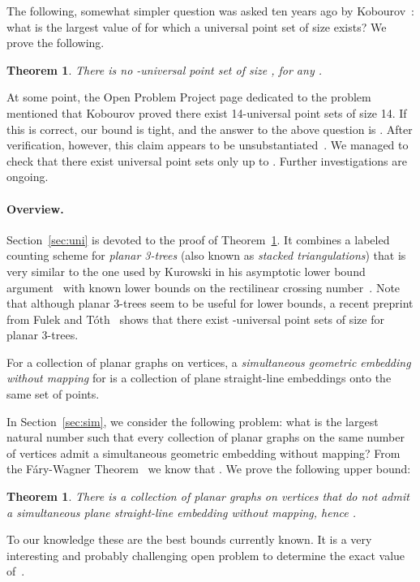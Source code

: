 \documentclass[11pt]{article}
\newtheorem{theorem}[equation]{Theorem}
\begin{document}
The following, somewhat simpler question was asked ten years ago by
Kobourov~\cite{dmo-topp-}: what is the largest value of  for which a
universal point set of size  exists? We prove the following.
\begin{theorem}
\label{thm:main}
There is no -universal point set of size , for any .
\end{theorem}

At some point, the Open Problem Project page dedicated to the
problem~\cite{dmo-topp-} mentioned that Kobourov proved there exist 14-universal
point sets of size 14. If this is correct, our bound is tight, and the answer to
the above question is . After verification, however, this claim appears to
be unsubstantiated~\cite{Kobourov}. We managed to check that there exist
universal point sets only up to . Further investigations are ongoing.

\paragraph{Overview.}
Section~\ref{sec:uni} is devoted to the proof of Theorem~\ref{thm:main}.  It
combines a labeled counting scheme for \emph{planar 3-trees} (also known as
\emph{stacked triangulations}) that is very similar to the one used by Kurowski
in his asymptotic lower bound argument~\cite{Kurowski04} with known lower bounds
on the rectilinear crossing number~\cite{AF05,lvww-cqk-04}.  Note that although
planar 3-trees seem to be useful for lower bounds, a recent preprint from Fulek
and T\'oth~\cite{FT12} shows that there exist -universal point sets of size
 for planar 3-trees.

For a collection  of planar graphs on 
vertices, a \emph{simultaneous geometric embedding without mapping} for
 is a collection of plane straight-line embeddings  onto the same set  of  points.

In Section~\ref{sec:sim}, we consider the following problem: what is the largest
natural number  such that every collection of  planar graphs on
the same number of vertices admit a simultaneous geometric embedding without
mapping? From the F\'ary-Wagner Theorem~\cite{f-slrpg-48,w-bzv-36} we know that
.  We prove the following upper bound:
\begin{theorem}\label{thm:sim}
  There is a collection of  planar graphs on  vertices that do not
  admit a simultaneous plane straight-line embedding without mapping, hence
  .
\end{theorem}
To our knowledge these are the best bounds currently known. It is a very
interesting and probably challenging open problem to determine the exact value
of~.
\end{document}
